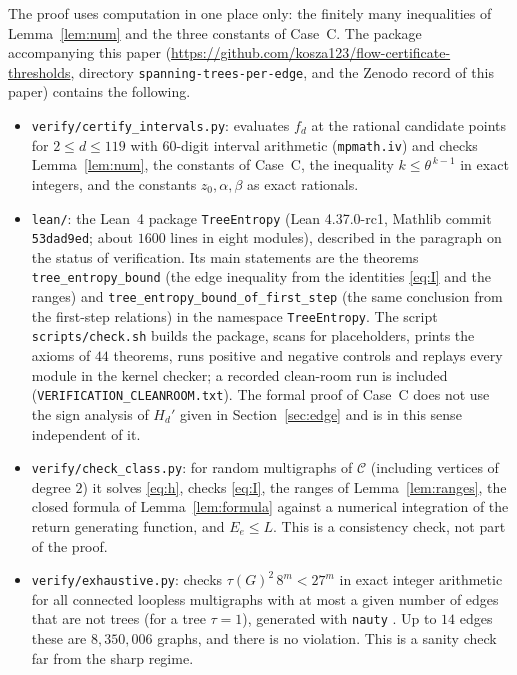 \documentclass[11pt]{amsart}
\theoremstyle{plain}
\theoremstyle{remark}
\newcommand{\cC}{\mathcal{C}}
\newcommand{\code}[1]{\texttt{#1}}
\newcommand{\tht}{\theta}
\begin{document}
The proof uses computation in one place only: the finitely many inequalities of Lemma~\ref{lem:num} and the three
constants of Case~C. The package accompanying this paper (\url{https://github.com/kosza123/flow-certificate-thresholds}, directory \code{spanning-trees-per-edge}, and the Zenodo record of this paper) contains the following.
\begin{itemize}
\item \code{verify/certify\_intervals.py}: evaluates $f_d$ at the rational candidate points for $2\le d\le119$ with
  $60$-digit interval arithmetic (\code{mpmath.iv}) and checks Lemma~\ref{lem:num}, the constants of Case~C, the
  inequality $k\le\tht^{\,k-1}$ in exact integers, and the constants $z_0,\alpha,\beta$ as exact rationals.
  
\item \begin{sloppypar}\code{lean/}: the Lean~4 package \code{TreeEntropy} (Lean 4.37.0-rc1, Mathlib commit
  \code{53dad9ed}; about $1600$ lines in eight modules), described in the paragraph on the status of
  verification. Its main statements are the theorems \code{tree\_entropy\_bound} (the edge inequality from the
  identities \eqref{eq:I} and the ranges) and \code{tree\_entropy\_bound\_of\_first\_step} (the same conclusion
  from the first-step relations) in the namespace \code{TreeEntropy}. The script \code{scripts/check.sh} builds the
  package, scans for placeholders, prints the axioms of $44$ theorems, runs positive and negative controls and
  replays every module in the kernel checker; a recorded clean-room run is included
  (\code{VERIFICATION\_CLEANROOM.txt}). The formal proof of Case~C does not use the sign analysis of $H_d'$ given
  in Section~\ref{sec:edge} and is in this sense independent of it.\end{sloppypar}
\item \code{verify/check\_class.py}: for random multigraphs of $\cC$ (including vertices of degree $2$) it solves
  \eqref{eq:h}, checks \eqref{eq:I}, the ranges of Lemma~\ref{lem:ranges}, the closed formula of
  Lemma~\ref{lem:formula} against a numerical integration of the return generating function, and
  $E_e\le L$. This is a consistency check, not part of the proof.
\item \code{verify/exhaustive.py}: checks $\tau(G)^2\,8^m<27^m$ in exact integer arithmetic for all connected
  loopless multigraphs with at most a given number of edges that are not trees (for a tree $\tau=1$), generated
  with \code{nauty} \cite{nauty}. Up to $14$ edges these are $8{,}350{,}006$ graphs, and there is no violation. This
  is a sanity check far from the sharp regime.
\end{itemize}
\end{document}
